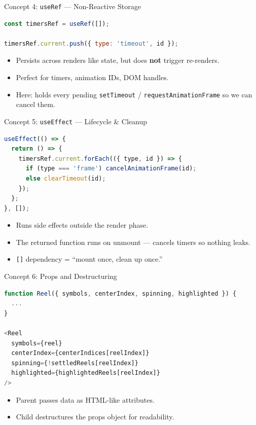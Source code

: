 \documentclass{beamer}
\begin{document}
\begin{frame}[fragile]{Concept 4: \texttt{useRef} --- Non-Reactive Storage}
\begin{lstlisting}[language=JavaScript]
const timersRef = useRef([]);

timersRef.current.push({ type: 'timeout', id });
\end{lstlisting}
  \begin{itemize}
    \item Persists across renders like state, but does \textbf{not} trigger re-renders.
    \item Perfect for timers, animation IDs, DOM handles.
    \item Here: holds every pending \texttt{setTimeout} / \texttt{requestAnimationFrame} so we can cancel them.
  \end{itemize}
\end{frame}

\begin{frame}[fragile]{Concept 5: \texttt{useEffect} --- Lifecycle \& Cleanup}
\begin{lstlisting}[language=JavaScript]
useEffect(() => {
  return () => {
    timersRef.current.forEach(({ type, id }) => {
      if (type === 'frame') cancelAnimationFrame(id);
      else clearTimeout(id);
    });
  };
}, []);
\end{lstlisting}
  \begin{itemize}
    \item Runs side effects outside the render phase.
    \item The returned function runs on unmount --- cancels timers so nothing leaks.
    \item \texttt{[]} dependency = ``mount once, clean up once.''
  \end{itemize}
\end{frame}

\begin{frame}[fragile]{Concept 6: Props and Destructuring}
\begin{lstlisting}[language=JavaScript]
function Reel({ symbols, centerIndex, spinning, highlighted }) {
  ...
}

<Reel
  symbols={reel}
  centerIndex={centerIndices[reelIndex]}
  spinning={!settledReels[reelIndex]}
  highlighted={highlightedReels[reelIndex]}
/>
\end{lstlisting}
  \begin{itemize}
    \item Parent passes data as HTML-like attributes.
    \item Child destructures the props object for readability.
  \end{itemize}
\end{frame}
\end{document}
